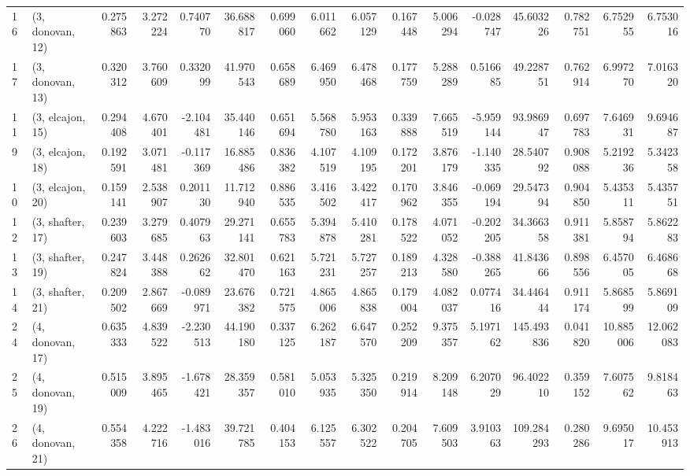 \begin{tabular}{llrrrrrrrrrrrrrr}
16 &  (3, donovan, 12) &   0.275863 &  3.272224 &  0.740770 &  36.688817 &  0.699060 &   6.011662 &  6.057129 &  0.167448 &  5.006294 & -0.028747 &   45.603226 &  0.782751 &   6.752955 &   6.753016 \\
17 &  (3, donovan, 13) &   0.320312 &  3.760609 &  0.332099 &  41.970543 &  0.658689 &   6.469950 &  6.478468 &  0.177759 &  5.288289 &  0.516685 &   49.228751 &  0.762914 &   6.997270 &   7.016320 \\
11 &  (3, elcajon, 15) &   0.294408 &  4.670401 & -2.104481 &  35.440146 &  0.651694 &   5.568780 &  5.953163 &  0.339888 &  7.665519 & -5.959144 &   93.986947 &  0.697783 &   7.646931 &   9.694687 \\
9  &  (3, elcajon, 18) &   0.192591 &  3.071481 & -0.117369 &  16.885486 &  0.836382 &   4.107519 &  4.109195 &  0.172201 &  3.876179 & -1.140335 &   28.540792 &  0.908088 &   5.219236 &   5.342358 \\
10 &  (3, elcajon, 20) &   0.159141 &  2.538907 &  0.201130 &  11.712940 &  0.886535 &   3.416502 &  3.422417 &  0.170962 &  3.846355 & -0.069194 &   29.547394 &  0.904850 &   5.435311 &   5.435751 \\
12 &  (3, shafter, 17) &   0.239603 &  3.279685 &  0.407963 &  29.271141 &  0.655783 &   5.394878 &  5.410281 &  0.178522 &  4.071052 & -0.202205 &   34.366358 &  0.911381 &   5.858794 &   5.862283 \\
13 &  (3, shafter, 19) &   0.247824 &  3.448388 &  0.262662 &  32.801470 &  0.621163 &   5.721231 &  5.727257 &  0.189213 &  4.328580 & -0.388265 &   41.843666 &  0.898556 &   6.457005 &   6.468668 \\
14 &  (3, shafter, 21) &   0.209502 &  2.867669 & -0.089971 &  23.676382 &  0.721575 &   4.865006 &  4.865838 &  0.179004 &  4.082037 &  0.077416 &   34.446444 &  0.911174 &   5.868599 &   5.869109 \\
24 &  (4, donovan, 17) &   0.635333 &  4.839522 & -2.230513 &  44.190180 &  0.337125 &   6.262187 &  6.647570 &  0.252209 &  9.375357 &  5.197162 &  145.493836 &  0.041820 &  10.885006 &  12.062083 \\
25 &  (4, donovan, 19) &   0.515009 &  3.895465 & -1.678421 &  28.359357 &  0.581010 &   5.053935 &  5.325350 &  0.219914 &  8.209148 &  6.207029 &   96.402210 &  0.359152 &   7.607562 &   9.818463 \\
26 &  (4, donovan, 21) &   0.554358 &  4.222716 & -1.483016 &  39.721785 &  0.404153 &   6.125557 &  6.302522 &  0.204705 &  7.609503 &  3.910363 &  109.284293 &  0.280286 &   9.695017 &  10.453913 \\

\end{tabular}
